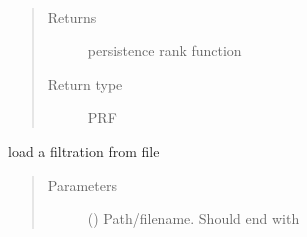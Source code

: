 \documentclass[letterpaper,10pt,openany,oneside,english]{sphinxmanual}
\begin{document}
\begin{fulllineitems}
\begin{fulllineitems}
\begin{quote}
\begin{description}
\end{description}\end{quote}

\end{fulllineitems}


\begin{fulllineitems}
\label{\detokenize{phomology:phomology.Filtration.prf}}~\begin{quote}\begin{description}
\item[{Returns}] \leavevmode
persistence rank function

\item[{Return type}] \leavevmode
PRF

\end{description}\end{quote}

\end{fulllineitems}


\end{fulllineitems}


\begin{fulllineitems}
\label{\detokenize{phomology:phomology.load_filtration}}
load a filtration from file
\begin{quote}\begin{description}
\item[{Parameters}] \leavevmode
{} () \textendash{} Path/filename. Should end with 

\end{description}\end{quote}

\end{fulllineitems}

\end{document}
